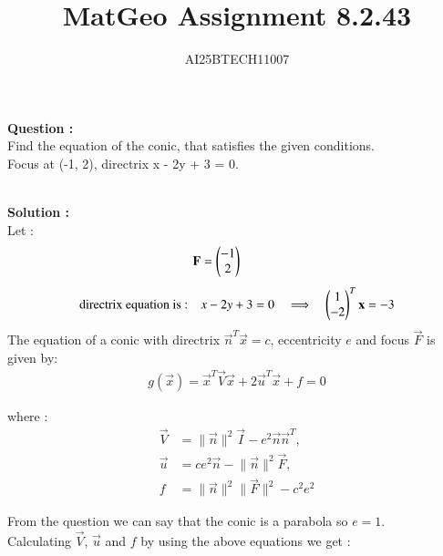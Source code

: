 \documentclass[journal]{IEEEtran}
\begin{document}

\vspace{3cm}

\title{MatGeo Assignment 8.2.43}
\author{AI25BTECH11007}
 \maketitle
{\let\newpage\relax\maketitle}

\renewcommand{\thefigure}{\theenumi}
\renewcommand{\thetable}{\theenumi}
\setlength{\intextsep}{10pt} %


\renewcommand{\thetable}{\theenumi}
\noindent
\textbf{Question :}\\
Find the equation of the conic, that satisfies the given conditions. \\ 
Focus at (-1, 2), directrix x - 2y + 3 =  0.  

\noindent\\
\textbf{Solution :}\\
Let :
\begin{align}
    \mathbf{F} &= \begin{pmatrix}-1\\2\end{pmatrix}\\[4pt]
    \text{directrix equation is :} \quad &x - 2y + 3 = 0 
    \quad\Longrightarrow\quad \begin{pmatrix}1\\-2\end{pmatrix}^{T}\mathbf{x} = -3
\end{align}
The equation of a conic with directrix $\vec{n}^{T}\vec{x} = c$, eccentricity $e$ and focus $\vec{F}$ is given by:
\begin{align}
    g(\vec{x}) = \vec{x}^{T}\vec{V}\vec{x} + 2\vec{u}^{T}\vec{x} + f  = 0
\end{align}

where :
\begin{align*}
\vec{V} &= \lVert \vec{n} \rVert^{2}\vec{I} - e^{2}\vec{n}\vec{n}^{T} , \\
\vec{u} &= ce^{2}\vec{n} - \lVert \vec{n} \rVert^{2}\vec{F} , \\
f &= \lVert \vec{n} \rVert^{2}\lVert \vec{F} \rVert^{2} - c^{2}e^{2}
\end{align*}

From the question we can say that the conic is a parabola so $e = 1$.\\
Calculating $\vec{V}$, $\vec{u}$ and $f$ by using the above equations we get :
\end{document}

